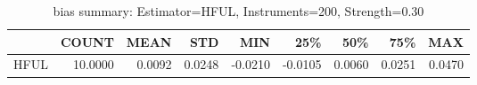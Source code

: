 \begin{table}[ht]
\centering
\caption{bias summary: Estimator=HFUL, Instruments=200, Strength=0.30}
\begin{tabular}{lrrrrrrrr}
\toprule
 & COUNT & MEAN & STD & MIN & 25\% & 50\% & 75\% & MAX \\
\midrule
HFUL & 10.0000 & 0.0092 & 0.0248 & -0.0210 & -0.0105 & 0.0060 & 0.0251 & 0.0470 \\
\bottomrule
\end{tabular}
\end{table}
